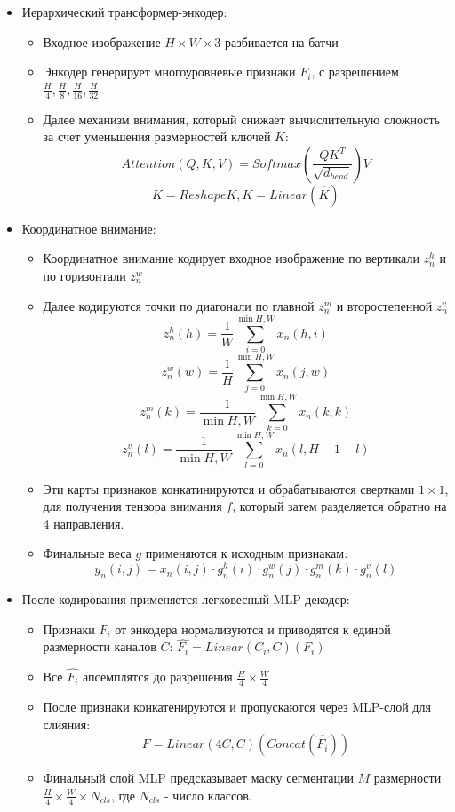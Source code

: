 \documentclass[areasetadvanced]{scrartcl}
\begin{document}
\begin{itemize}
    \item Иерархический трансформер-энкодер: \begin{itemize}
            \item Входное изображение $H \times W \times 3$ разбивается на батчи
            \item Энкодер генерирует многоуровневые признаки $F_i$, с разрешением $\frac{H}{4}, \frac{H}{8}, \frac{H}{16}, \frac{H}{32}$
            \item Далее механизм внимания, который снижает вычислительную сложность за счет уменьшения размерностей ключей $K$:
                $$ Attention(Q,K,V) = Softmax(\frac{QK^T}{\sqrt{d_{head}}}) V $$
                $$ \hat{K} = Reshape{K}, K = Linear(\hat{K}) $$
        \end{itemize}
    \item Координатное внимание: \begin{itemize}
        \item Координатное внимание кодирует входное изображение по вертикали $z_{n}^{h}$ и по горизонтали $z_{n}^{w}$
        \item Далее кодируются точки по диагонали по главной $z_{n}^{m}$ и второстепенной $z_{n}^{v}$
                $$ z_{n}^{h}(h) = \frac{1}{W} \sum_{i = 0}^{\min{H,W}} x_n(h,i) $$
                $$ z_{n}^{w}(w) = \frac{1}{H} \sum_{j = 0}^{\min{H,W}} x_n(j,w) $$
                $$ z_{n}^{m}(k) = \frac{1}{\min{H,W}} \sum_{k = 0}^{\min{H,W}} x_n(k,k) $$
                $$ z_{n}^{v}(l) = \frac{1}{\min{H,W}} \sum_{l = 0}^{\min{H,W}} x_n(l, H - 1 - l) $$ 
        \item Эти карты признаков конкатинируются и обрабатываются свертками $1 \times 1$, для получения тензора внимания $f$, который затем разделяется обратно на 4 направления.
        \item Финальные веса $g$ применяются к исходным признакам:
                $$ y_n(i, j) = x_n(i,j) \cdot g_n^h(i) \cdot g_n^w(j) \cdot g_n^m(k) \cdot g_n^v(l) $$
    \end{itemize}
    \item После кодирования применяется легковесный MLP-декодер: \begin{itemize}
        \item Признаки $F_i$ от энкодера нормализуются и приводятся к единой размерности каналов $C$: $\hat{F_i} = Linear(C_i, C)(F_i) $
        \item Все $\hat{F_i}$ апсемплятся до разрешения $\frac{H}{4} \times \frac{W}{4}$
        \item После признаки конкатенируются и пропускаются через MLP-слой для слияния: 
            $$ F = Linear(4C,C)(Concat(\hat{F_i})) $$
        \item Финальный слой MLP предсказывает маску сегментации $M$ размерности $\frac{H}{4} \times \frac{W}{4} \times N_{cls}$, где $N_{cls}$ - число классов.
    \end{itemize}
\end{itemize}
\end{document}
